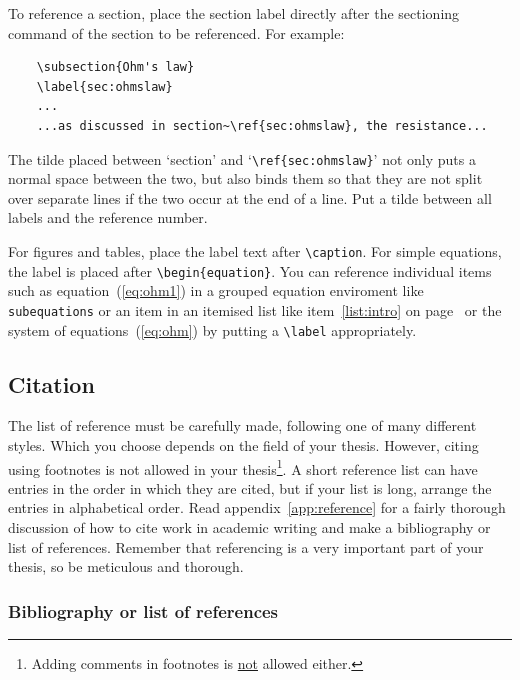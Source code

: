 \documentclass[english, 12pt, a4paper, biz, utf8, a-2b, online]{aaltothesis}
\begin{document}
To reference a section, place the section label directly after the sectioning 
command of the section to be referenced. For example:
\begin{verbatim}
	\subsection{Ohm's law}
	\label{sec:ohmslaw}
	...
	...as discussed in section~\ref{sec:ohmslaw}, the resistance...
\end{verbatim}
The tilde placed between `section' and `\verb+\ref{sec:ohmslaw}+' not only puts 
a normal space between the two, but also binds them so that they are not split 
over separate lines if the two occur at the end of a line. Put a tilde between 
all labels and the reference number.

For figures and tables, place the label text after \verb+\caption+. For simple 
equations, the label is placed after \verb+\begin{equation}+. You can reference
individual items such as equation~(\ref{eq:ohm1}) in a grouped equation 
enviroment like \verb+subequations+ or an item in an itemised list like 
item~\ref{list:intro} on page~\pageref{list:intro} or the system of 
equations~(\ref{eq:ohm}) by putting a \verb+\label+ appropriately.

\subsection{Citation}

The list of reference must be carefully made, following one of many different 
styles. Which you choose depends on the field of your thesis. However, citing 
using footnotes is not allowed in your thesis\footnote{Adding comments in 
footnotes is \underline{not} allowed either.}. A short reference list can have 
entries in the order in which they are cited, but if your list is long, arrange 
the entries in alphabetical order. Read appendix~\ref{app:reference} for a 
fairly thorough discussion of how to cite work in academic writing and make a 
bibliography or list of references. Remember that referencing is a very 
important part of your thesis, so be meticulous and thorough.

\subsubsection{Bibliography or list of references}
\end{document}

